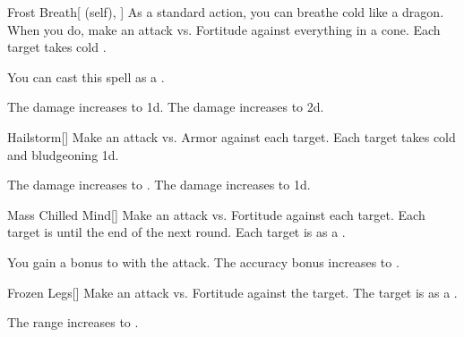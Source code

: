 \lowercase{\hypertarget{spell:Frost Breath}{}}\label{spell:Frost Breath}
\begin{attuneability}[Rank 4]{\hypertarget{spell:Frost Breath}{Frost Breath}}[ (self), ]
As a standard action, you can breathe cold like a dragon.
When you do, make an attack vs. Fortitude against everything in a \arealarge cone.
\hit Each target takes cold .

You can cast this spell as a .

\rankline
{} The damage increases to  \plus1d.
 The damage increases to  \plus2d.
\end{attuneability}
\vspace{0.25em}



\lowercase{\hypertarget{spell:Hailstorm}{}}\label{spell:Hailstorm}
\begin{freeability}[Rank 4]{\hypertarget{spell:Hailstorm}{Hailstorm}}[]
Make an attack vs. Armor against each target.
\hit Each target takes cold and bludgeoning  \minus1d.

\rankline
{} The damage increases to .
 The damage increases to  \plus1d.
\end{freeability}
\vspace{0.25em}



\lowercase{\hypertarget{spell:Mass Chilled Mind}{}}\label{spell:Mass Chilled Mind}
\begin{freeability}[Rank 4]{\hypertarget{spell:Mass Chilled Mind}{Mass Chilled Mind}}[]
Make an attack vs. Fortitude against each target.
\hit Each target is  until the end of the next round.
\crit Each target is  as a .

\rankline
{} You gain a  bonus to  with the attack.
 The accuracy bonus increases to .
\end{freeability}
\vspace{0.25em}



\lowercase{\hypertarget{spell:Frozen Legs}{}}\label{spell:Frozen Legs}
\begin{freeability}[Rank 5]{\hypertarget{spell:Frozen Legs}{Frozen Legs}}[]
Make an attack vs. Fortitude against the target.
\hit The target is  as a .

\rankline
{} The range increases to \rngmed.
\end{freeability}
\vspace{0.25em}



